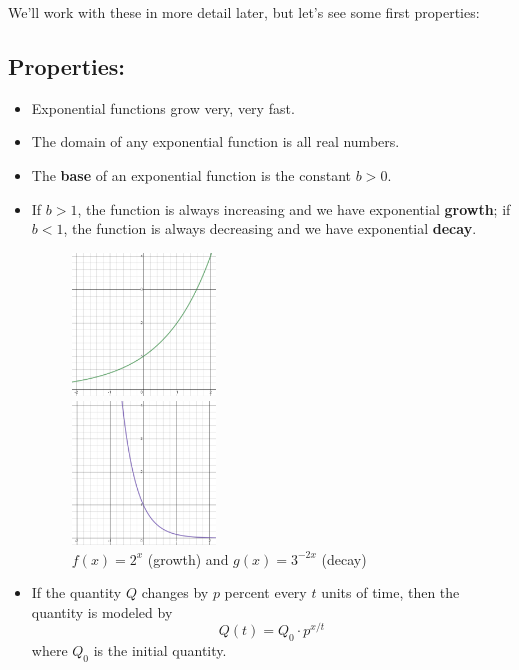 \documentclass[11pt,reqno,final]{amsart}
\numberwithin{equation}{section}
\numberwithin{figure}{section}
\theoremstyle{definition} %
\begin{document}
We'll work with these in more detail later, but let's see some first properties:

\subsection*{Properties:}
\begin{itemize}
\item Exponential functions grow very, very fast.
\item The domain of any exponential function is all real numbers.
\item The \textbf{base} of an exponential function is the constant $b > 0$.
\item If $b > 1$, the function is always increasing and we have exponential \textbf{growth};
        if $b < 1$, the function is always decreasing and we have exponential \textbf{decay}.
        \begin{figure}[ht]
                \begin{minipage}{0.4\linewidth}
                        \begin{center}
                                \includegraphics[width=1.5in]{09-07P_exp1.png}
                        \end{center}
                \end{minipage}
                \begin{minipage}{0.4\linewidth}
                        \begin{center}
                                \includegraphics[width=1.5in]{09-07P_exp2.png}
                        \end{center}
                \end{minipage}
                \caption{$f(x) = 2^x$ (growth) and $g(x) = 3^{-2x}$ (decay)}
        \end{figure}
\item If the quantity $Q$ changes by $p$ percent every $t$ units of time, then the quantity is modeled by
        \[
                Q(t) = Q_0 \cdot p^{x/t}
        \]
        where $Q_0$ is the initial quantity.
\end{itemize}
\end{document}

